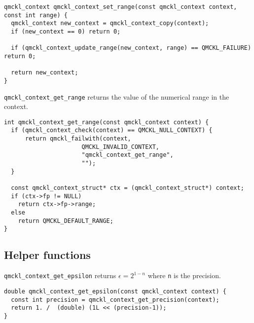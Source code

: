\begin{verbatim}
qmckl_context qmckl_context_set_range(const qmckl_context context, const int range) {
  qmckl_context new_context = qmckl_context_copy(context);
  if (new_context == 0) return 0;

  if (qmckl_context_update_range(new_context, range) == QMCKL_FAILURE) return 0;

  return new_context;
}
\end{verbatim}

\texttt{qmckl\_context\_get\_range} returns the value of the numerical range in the context.

\begin{verbatim}
int qmckl_context_get_range(const qmckl_context context) {
  if (qmckl_context_check(context) == QMCKL_NULL_CONTEXT) {
      return qmckl_failwith(context,
                      QMCKL_INVALID_CONTEXT,
                      "qmckl_context_get_range",
                      "");
  }

  const qmckl_context_struct* ctx = (qmckl_context_struct*) context;
  if (ctx->fp != NULL) 
    return ctx->fp->range;
  else
    return QMCKL_DEFAULT_RANGE;
}
\end{verbatim}
\subsection{Helper functions}
\label{sec:org953484b}

\texttt{qmckl\_context\_get\_epsilon} returns \(\epsilon = 2^{1-n}\) where \texttt{n} is the precision.

\begin{verbatim}
double qmckl_context_get_epsilon(const qmckl_context context) {
  const int precision = qmckl_context_get_precision(context);
  return 1. /  (double) (1L << (precision-1));
}
\end{verbatim}
